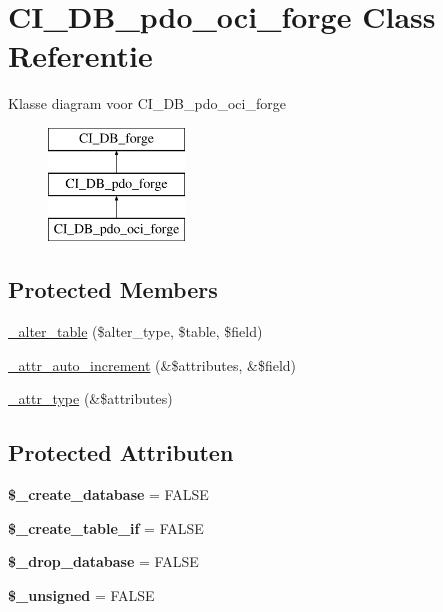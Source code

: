 \hypertarget{class_c_i___d_b__pdo__oci__forge}{}\section{C\+I\+\_\+\+D\+B\+\_\+pdo\+\_\+oci\+\_\+forge Class Referentie}
\label{class_c_i___d_b__pdo__oci__forge}
Klasse diagram voor C\+I\+\_\+\+D\+B\+\_\+pdo\+\_\+oci\+\_\+forge\begin{figure}[H]
\begin{center}
\leavevmode
\includegraphics[height=3.000000cm]{class_c_i___d_b__pdo__oci__forge}
\end{center}
\end{figure}
\subsection*{Protected Members}
\begin{DoxyCompactItemize}
\item 
\mbox{\hyperlink{class_c_i___d_b__pdo__oci__forge_a41c6cae02f2fda8b429ad0afb9509426}{\+\_\+alter\+\_\+table}} (\$alter\+\_\+type, \$table, \$field)
\item 
\mbox{\hyperlink{class_c_i___d_b__pdo__oci__forge_a2a013a5932439c3c44f0dad3436525f7}{\+\_\+attr\+\_\+auto\+\_\+increment}} (\&\$attributes, \&\$field)
\item 
\mbox{\hyperlink{class_c_i___d_b__pdo__oci__forge_a8553be952084c6f7cdfff370a1d14f6b}{\+\_\+attr\+\_\+type}} (\&\$attributes)
\end{DoxyCompactItemize}
\subsection*{Protected Attributen}
\begin{DoxyCompactItemize}
\item 
\mbox{\label{class_c_i___d_b__pdo__oci__forge_acd23c9a8735806155f1a5d0a87c151f2}} 
{\bfseries \$\+\_\+create\+\_\+database} = F\+A\+L\+SE
\item 
\mbox{\label{class_c_i___d_b__pdo__oci__forge_a2f6484fcb8d1dc3eef67a637227cd583}} 
{\bfseries \$\+\_\+create\+\_\+table\+\_\+if} = F\+A\+L\+SE
\item 
\mbox{\label{class_c_i___d_b__pdo__oci__forge_a8305b12fc17f6f87778260ebdff287b4}} 
{\bfseries \$\+\_\+drop\+\_\+database} = F\+A\+L\+SE
\item 
\mbox{\label{class_c_i___d_b__pdo__oci__forge_aae977ae6d61fa183f0b25422b6ddc31c}} 
{\bfseries \$\+\_\+unsigned} = F\+A\+L\+SE
\end{DoxyCompactItemize}
